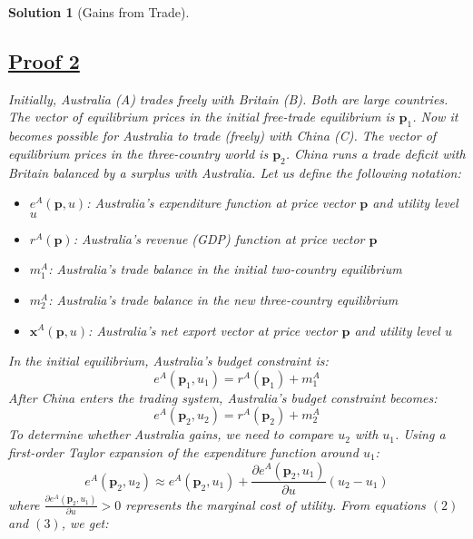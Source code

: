 \documentclass[a4paper,12pt]{article} %
\theoremstyle{nonitalic}
\newtheorem{solution}{Solution}
\begin{document}
\begin{solution}[Gains from Trade]
    \subsection*{\underline{Proof 2}}
    Initially, Australia (A) trades freely with Britain (B). Both are large countries. The vector of equilibrium prices in the initial free-trade equilibrium is $\mathbf{p}_1$. Now it becomes possible for Australia to trade (freely) with China (C). The vector of equilibrium prices in the three-country world is $\mathbf{p}_2$. China runs a trade deficit with Britain balanced by a surplus with Australia.
    Let us define the following notation:
    \begin{itemize}
        \item $e^A(\mathbf{p}, u)$: Australia's expenditure function at price vector $\mathbf{p}$ and utility level $u$
        \item $r^A(\mathbf{p})$: Australia's revenue (GDP) function at price vector $\mathbf{p}$
        \item $m^A_1$: Australia's trade balance in the initial two-country equilibrium
        \item $m^A_2$: Australia's trade balance in the new three-country equilibrium
        \item $\mathbf{x}^A(\mathbf{p}, u)$: Australia's net export vector at price vector $\mathbf{p}$ and utility level $u$
    \end{itemize}
    In the initial equilibrium, Australia's budget constraint is:
    \begin{equation}
        e^A(\mathbf{p}_1, u_1) = r^A(\mathbf{p}_1) + m^A_1 \tag{1}
    \end{equation}
    After China enters the trading system, Australia's budget constraint becomes:
    \begin{equation}
        e^A(\mathbf{p}_2, u_2) = r^A(\mathbf{p}_2) + m^A_2 \tag{2}
    \end{equation}
    To determine whether Australia gains, we need to compare $u_2$ with $u_1$.
    Using a first-order Taylor expansion of the expenditure function around $u_1$:
    \begin{equation}
        e^A(\mathbf{p}_2, u_2) \approx e^A(\mathbf{p}_2, u_1) + \frac{\partial e^A(\mathbf{p}_2, u_1)}{\partial u}(u_2 - u_1) \tag{3}
    \end{equation}
    where $\frac{\partial e^A(\mathbf{p}_2, u_1)}{\partial u} > 0$ represents the marginal cost of utility.
    From equations $(2)$ and $(3)$, we get:
    \begin{equation}

\end{equation}
\end{solution}
\end{document}
